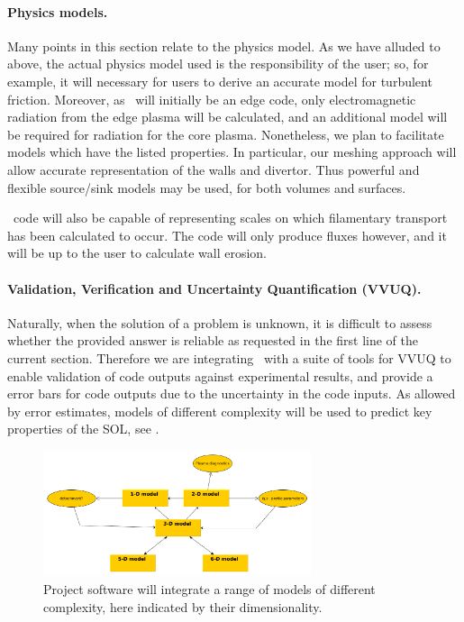 \paragraph{Physics models.}
Many points in this section relate to the physics model.
As we have alluded to above, the actual physics model used is the
responsibility of the user;
so, for example, it will necessary for users to derive an accurate model for
turbulent friction.
Moreover, as \nep\ will initially be an edge code, only electromagnetic
radiation from the edge plasma will be calculated, and an additional model will
be required for radiation for the core plasma. 
Nonetheless, we plan to facilitate models which have the listed properties.
In particular, our meshing approach will allow accurate representation of the
walls and divertor.
Thus powerful and flexible source/sink models may be used, for both volumes and
surfaces.

\nep\ code will also be capable of representing scales on which filamentary
transport has been calculated to occur.
The code will only produce fluxes however, and it will be up to the user to
calculate wall erosion.



\paragraph{Validation, Verification and Uncertainty Quantification (VVUQ).}
Naturally, when the solution of a problem is unknown, it is difficult to assess
whether the provided answer is reliable as requested in the first line of the current section.
Therefore we are integrating \nep\ with a suite of tools for VVUQ to enable
validation of code outputs against experimental results, and provide a error
bars for code outputs due to the uncertainty in the code inputs.
As allowed by error estimates, models of different complexity will be used
to predict key properties of the SOL, see .
\begin{figure}
\centerline{\includegraphics[width=0.7\textwidth]{./pics/dimensions2.png}}
\caption{
Project software will integrate a range of models of different complexity, here
indicated by their dimensionality.
\label{fig:dimensions2}}
\end{figure}
